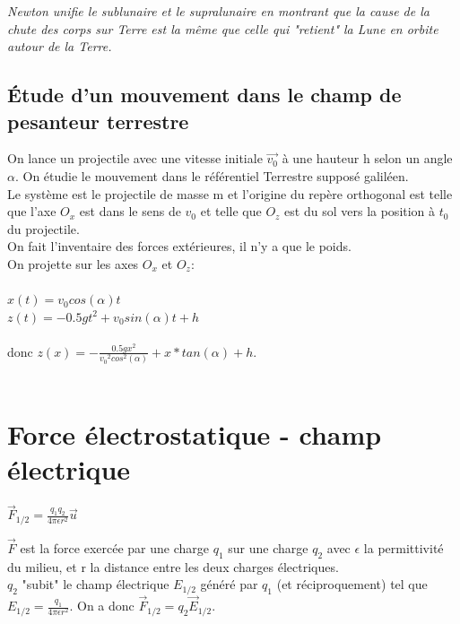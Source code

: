 \documentclass[a4paper,10pt]{book}
\begin{document}
\textit{Newton unifie le sublunaire et le supralunaire en montrant que la cause de la chute des corps sur Terre est la même que celle qui "retient" la Lune en orbite autour de la Terre.}

\newpage

\subsection{Étude d'un mouvement dans le champ de pesanteur terrestre}
On lance un projectile avec une vitesse initiale $\vec{v_{0}}$ à une hauteur h selon un angle $\alpha$. On étudie le mouvement dans le référentiel Terrestre supposé galiléen.\\

Le système est le projectile de masse m et l'origine du repère orthogonal est telle que l'axe $O_{x}$ est dans le sens de $v_{0}$ et telle que $O_{z}$ est du sol vers la position à $t_{0}$ du projectile.\\

On fait l'inventaire des forces extérieures, il n'y a que le poids.\\
On projette sur les axes $O_{x}$ et $O_{z}$:\\\\
$x(t)=v_{0}cos(\alpha)t$\\
$z(t)=-0.5gt^{2}+v_{0}sin(\alpha)t+h$\\\\
donc $z(x)=-\frac{0.5gx^{2}}{v_{0}{}^{2}cos^{2}(\alpha)}+x*tan(\alpha)+h$.\\\\

\section{Force électrostatique - champ électrique}
\begin{center} \begin{Large}
$\vec{F}_{1/2}=\frac{q_{1}q_{2}}{4\pi \epsilon r^{2}}\vec{u}$\\ \end{Large} \end{center}

$\vec{F}$ est la force exercée par une charge $q_{1}$ sur une charge $q_{2}$ avec $\epsilon$ la permittivité du milieu, et r la distance entre les deux charges électriques.\\

$q_{2}$ "subit" le champ électrique $E_{1/2}$ généré par $q_{1}$ (et réciproquement) tel que $E_{1/2}=\frac{q_{1}}{4\pi \epsilon r^{2}}$. On a donc $\vec{F}_{1/2}=q_{2}\vec{E}_{1/2}$.\\
\end{document}
